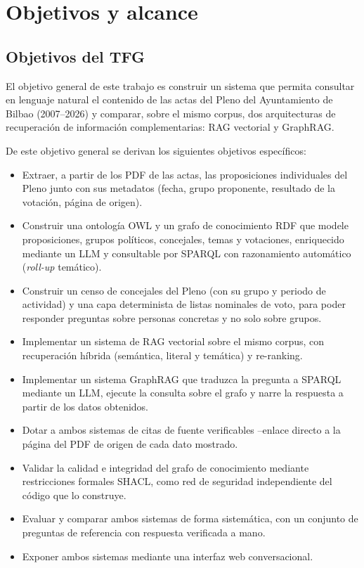 \chapter{Objetivos y alcance}
\label{ch:objetivos}

\section{Objetivos del TFG}

El objetivo general de este trabajo es construir un sistema que permita consultar
en lenguaje natural el contenido de las actas del Pleno del Ayuntamiento de Bilbao
(2007--2026) y comparar, sobre el mismo corpus, dos arquitecturas de recuperación
de información complementarias: RAG vectorial y GraphRAG.

De este objetivo general se derivan los siguientes objetivos específicos:

\begin{itemize}
	\item Extraer, a partir de los PDF de las actas, las proposiciones individuales
	del Pleno junto con sus metadatos (fecha, grupo proponente, resultado de la
	votación, página de origen).
	\item Construir una ontología OWL y un grafo de conocimiento RDF que modele
	proposiciones, grupos políticos, concejales, temas y votaciones, enriquecido
	mediante un LLM y consultable por SPARQL con razonamiento automático
	(\textit{roll-up} temático).
	\item Construir un censo de concejales del Pleno (con su grupo y periodo de
	actividad) y una capa determinista de listas nominales de voto, para poder
	responder preguntas sobre personas concretas y no solo sobre grupos.
	\item Implementar un sistema de RAG vectorial sobre el mismo corpus, con
	recuperación híbrida (semántica, literal y temática) y re-ranking.
	\item Implementar un sistema GraphRAG que traduzca la pregunta a SPARQL
	mediante un LLM, ejecute la consulta sobre el grafo y narre la respuesta a
	partir de los datos obtenidos.
	\item Dotar a ambos sistemas de citas de fuente verificables --enlace directo
	a la página del PDF de origen de cada dato mostrado.
	\item Validar la calidad e integridad del grafo de conocimiento mediante
	restricciones formales SHACL, como red de seguridad independiente del
	código que lo construye.
	\item Evaluar y comparar ambos sistemas de forma sistemática, con un conjunto
	de preguntas de referencia con respuesta verificada a mano.
	\item Exponer ambos sistemas mediante una interfaz web conversacional.
\end{itemize}

